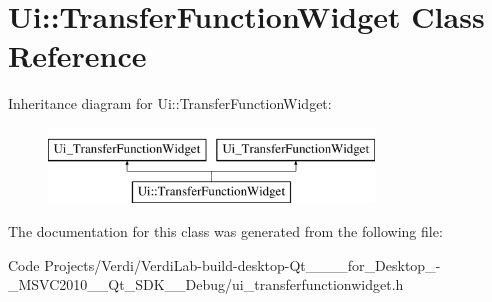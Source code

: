\hypertarget{class_ui_1_1_transfer_function_widget}{\section{\-Ui\-:\-:\-Transfer\-Function\-Widget \-Class \-Reference}
\label{class_ui_1_1_transfer_function_widget}
}
\-Inheritance diagram for \-Ui\-:\-:\-Transfer\-Function\-Widget\-:\begin{figure}[H]
\begin{center}
\leavevmode
\includegraphics[height=2.000000cm]{class_ui_1_1_transfer_function_widget}
\end{center}
\end{figure}


\-The documentation for this class was generated from the following file\-:\begin{DoxyCompactItemize}
\item 
\-Code Projects/\-Verdi/\-Verdi\-Lab-\/build-\/desktop-\/\-Qt\-\_\-\_\-\_\-\_\-for\-\_\-\-Desktop\-\_\--\/\-\_\-\-M\-S\-V\-C2010\-\_\-\-\_\-\-Qt\-\_\-\-S\-D\-K\-\_\-\-\_\-\-Debug/ui\-\_\-transferfunctionwidget.\-h\end{DoxyCompactItemize}
